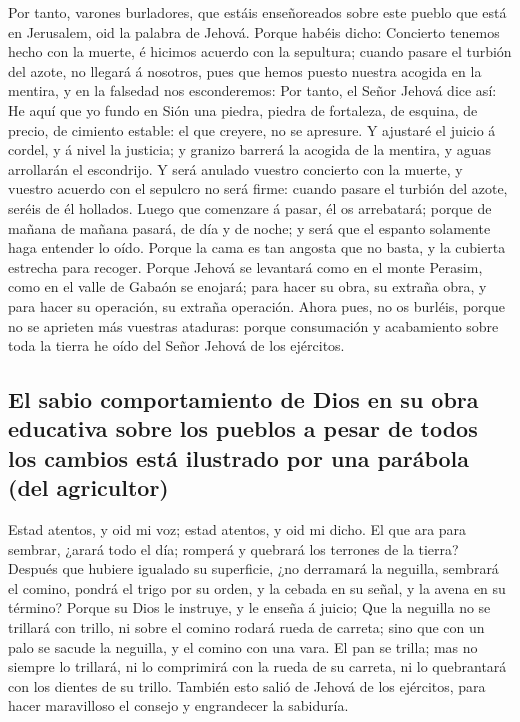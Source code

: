  Por tanto, varones burladores, que estáis enseñoreados
sobre este pueblo que está en Jerusalem, oid la palabra de Jehová.
 Porque habéis dicho: Concierto tenemos hecho con la
muerte, é hicimos acuerdo con la sepultura; cuando pasare el turbión del
azote, no llegará á nosotros, pues que hemos puesto nuestra acogida en
la mentira, y en la falsedad nos esconderemos:  Por tanto,
el Señor Jehová dice así: He aquí que yo fundo en Sión una piedra,
piedra de fortaleza, de esquina, de precio, de cimiento estable: el que
creyere, no se apresure.  Y ajustaré el juicio á cordel, y
á nivel la justicia; y granizo barrerá la acogida de la mentira, y aguas
arrollarán el escondrijo.  Y será anulado vuestro concierto
con la muerte, y vuestro acuerdo con el sepulcro no será firme: cuando
pasare el turbión del azote, seréis de él hollados.  Luego
que comenzare á pasar, él os arrebatará; porque de mañana de mañana
pasará, de día y de noche; y será que el espanto solamente haga entender
lo oído.  Porque la cama es tan angosta que no basta, y la
cubierta estrecha para recoger.  Porque Jehová se levantará
como en el monte Perasim, como en el valle de Gabaón se enojará; para
hacer su obra, su extraña obra, y para hacer su operación, su extraña
operación.  Ahora pues, no os burléis, porque no se
aprieten más vuestras ataduras: porque consumación y acabamiento sobre
toda la tierra he oído del Señor Jehová de los ejércitos.

\hypertarget{el-sabio-comportamiento-de-dios-en-su-obra-educativa-sobre-los-pueblos-a-pesar-de-todos-los-cambios-estuxe1-ilustrado-por-una-paruxe1bola-del-agricultor}{%
\subsection{El sabio comportamiento de Dios en su obra educativa sobre
los pueblos a pesar de todos los cambios está ilustrado por una parábola
(del
agricultor)}\label{el-sabio-comportamiento-de-dios-en-su-obra-educativa-sobre-los-pueblos-a-pesar-de-todos-los-cambios-estuxe1-ilustrado-por-una-paruxe1bola-del-agricultor}}

 Estad atentos, y oid mi voz; estad atentos, y oid mi
dicho.  El que ara para sembrar, ¿arará todo el día;
romperá y quebrará los terrones de la tierra?  Después que
hubiere igualado su superficie, ¿no derramará la neguilla, sembrará el
comino, pondrá el trigo por su orden, y la cebada en su señal, y la
avena en su término?  Porque su Dios le instruye, y le
enseña á juicio;  Que la neguilla no se trillará con
trillo, ni sobre el comino rodará rueda de carreta; sino que con un palo
se sacude la neguilla, y el comino con una vara.  El pan se
trilla; mas no siempre lo trillará, ni lo comprimirá con la rueda de su
carreta, ni lo quebrantará con los dientes de su trillo. 
También esto salió de Jehová de los ejércitos, para hacer maravilloso el
consejo y engrandecer la sabiduría.

